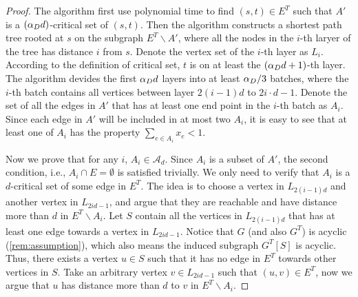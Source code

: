 \begin{proof}
	The algorithm first use polynomial time to find $(s,t)\in E^T$ such that $A'$ is a $(\alpha_D{} d)$-critical set of $(s,t)$. Then the algorithm constructs a shortest path tree rooted at $s$ on the subgraph $E^T\backslash A'$, where all the nodes in the $i$-th laryer of the tree has distance $i$ from $s$. Denote the vertex set of the $i$-th layer as $L_i$. According to the definition of critical set, $t$ is on at least the $(\alpha_D{} d+1)$-th layer. The algorithm devides the first $\alpha_D{} d$ layers into at least $\alpha_D{}/3$ batches, where the $i$-th batch contains all vertices between layer $2(i-1)d$ to $2i\cdot d-1$. Denote the set of all the edges in $A'$ that has at least one end point in the $i$-th batch as $A_i$. Since each edge in $A'$ will be included in at most two $A_i$, it is easy to see that at least one of $A_i$ has the property $\sum_{e\in A_i}x_e<1$. 
	
	Now we prove that for any $i$, $A_i\in\mathcal{A}_d$. Since $A_i$ is a subset of $A'$, the second condition, i.e., $A_i\cap E=\emptyset$ is satisfied trivially. We only need to verify that $A_i$ is a $d$-critical set of some edge in $E^T$. The idea is to choose a vertex in $L_{2(i-1)d}$ and another vertex in $L_{2id-1}$, and argue that they are reachable and have distance more than $d$ in $E^T\backslash A_i$. Let $S$ contain all the vertices in $L_{2(i-1)d}$ that has at least one edge towards a vertex in $L_{2id-1}$. Notice that $G$ (and also $G^T$) is acyclic (\cref{rem:assumption}), which also means the induced subgraph $G^T[S]$ is acyclic. Thus, there exists a vertex $u\in S$ such that it has no edge in $E^T$ towards other vertices in $S$. Take an arbitrary vertex $v\in L_{2id-1}$ such that $(u,v)\in E^T$, now we argue that $u$ has distance more than $d$ to $v$ in $E^T\backslash A_i$.  
	

\end{proof}
